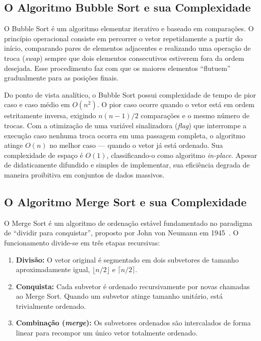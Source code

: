 \documentclass[12pt]{article}
\begin{document}
\subsection{O Algoritmo Bubble Sort e sua Complexidade}

O Bubble Sort é um algoritmo elementar iterativo e baseado em comparações. O
princípio operacional consiste em percorrer o vetor repetidamente a partir do
início, comparando pares de elementos adjacentes e realizando uma operação de
troca (\textit{swap}) sempre que dois elementos consecutivos estiverem fora da
ordem desejada. Esse procedimento faz com que os maiores elementos
``flutuem'' gradualmente para as posições finais.

Do ponto de vista analítico, o Bubble Sort possui complexidade de tempo de
pior caso e caso médio em $O(n^2)$. O pior caso ocorre quando o vetor está
em ordem estritamente inversa, exigindo $n(n-1)/2$ comparações e o mesmo
número de trocas. Com a otimização de uma variável sinalizadora
(\textit{flag}) que interrompe a execução caso nenhuma troca ocorra em uma
passagem completa, o algoritmo atinge $O(n)$ no melhor caso — quando o vetor
já está ordenado. Sua complexidade de espaço é $O(1)$, classificando-o como
algoritmo \textit{in-place}. Apesar de didaticamente difundido e simples de
implementar, sua eficiência degrada de maneira proibitiva em conjuntos de
dados massivos.

\subsection{O Algoritmo Merge Sort e sua Complexidade}

O Merge Sort é um algoritmo de ordenação estável fundamentado no paradigma de
``dividir para conquistar'', proposto por John von Neumann em
1945~\cite{knuth}. O funcionamento divide-se em três etapas recursivas:

\begin{enumerate}
    \item \textbf{Divisão:} O vetor original é segmentado em dois subvetores
          de tamanho aproximadamente igual, $\lfloor n/2 \rfloor$ e
          $\lceil n/2 \rceil$.
    \item \textbf{Conquista:} Cada subvetor é ordenado recursivamente por
          novas chamadas ao Merge Sort. Quando um subvetor atinge tamanho
          unitário, está trivialmente ordenado.
    \item \textbf{Combinação (\textit{merge}):} Os subvetores ordenados são
          intercalados de forma linear para recompor um único vetor totalmente
          ordenado.
\end{enumerate}
\end{document}
